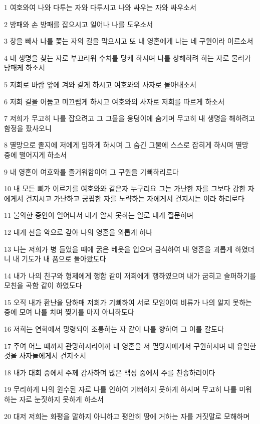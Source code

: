 \par 1 여호와여 나와 다투는 자와 다투시고 나와 싸우는 자와 싸우소서
\par 2 방패와 손 방패를 잡으시고 일어나 나를 도우소서
\par 3 창을 빼사 나를 쫓는 자의 길을 막으시고 또 내 영혼에게 나는 네 구원이라 이르소서
\par 4 내 생명을 찾는 자로 부끄러워 수치를 당케 하시며 나를 상해하려 하는 자로 물러가 낭패케 하소서
\par 5 저희로 바람 앞에 겨와 같게 하시고 여호와의 사자로 몰아내소서
\par 6 저희 길을 어둡고 미끄럽게 하시고 여호와의 사자로 저희를 따르게 하소서
\par 7 저희가 무고히 나를 잡으려고 그 그물을 웅덩이에 숨기며 무고히 내 생명을 해하려고 함정을 팠사오니
\par 8 멸망으로 졸지에 저에게 임하게 하시며 그 숨긴 그물에 스스로 잡히게 하시며 멸망 중에 떨어지게 하소서
\par 9 내 영혼이 여호와를 즐거워함이여 그 구원을 기뻐하리로다
\par 10 내 모든 뼈가 이르기를 여호와와 같은자 누구리요 그는 가난한 자를 그보다 강한 자에게서 건지시고 가난하고 궁핍한 자를 노략하는 자에게서 건지시는 이라 하리로다
\par 11 불의한 증인이 일어나서 내가 알지 못하는 일로 내게 힐문하며
\par 12 내게 선을 악으로 갚아 나의 영혼을 외롭게 하나
\par 13 나는 저희가 병 들었을 때에 굵은 베옷을 입으며 금식하여 내 영혼을 괴롭게 하였더니 내 기도가 내 품으로 돌아왔도다
\par 14 내가 나의 친구와 형제에게 행함 같이 저희에게 행하였으며 내가 굽히고 슬퍼하기를 모친을 곡함 같이 하였도다
\par 15 오직 내가 환난을 당하매 저희가 기뻐하여 서로 모임이여 비류가 나의 알지 못하는 중에 모여 나를 치며 찢기를 마지 아니하도다
\par 16 저희는 연회에서 망령되이 조롱하는 자 같이 나를 향하여 그 이를 갈도다
\par 17 주여 어느 때까지 관망하시리이까 내 영혼을 저 멸망자에게서 구원하시며 내 유일한 것을 사자들에게서 건지소서
\par 18 내가 대회 중에서 주께 감사하며 많은 백성 중에서 주를 찬송하리이다
\par 19 무리하게 나의 원수된 자로 나를 인하여 기뻐하지 못하게 하시며 무고히 나를 미워하는 자로 눈짓하지 못하게 하소서
\par 20 대저 저희는 화평을 말하지 아니하고 평안히 땅에 거하는 자를 거짓말로 모해하며
